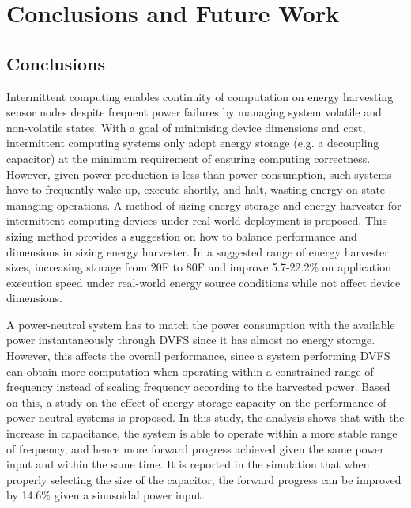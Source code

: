 \chapter{Conclusions and Future Work} \label{chapter:conclusion}

\section{Conclusions} 

Intermittent computing enables continuity of computation on energy harvesting sensor nodes despite frequent power failures by managing system volatile and non-volatile states. With a goal of minimising device dimensions and cost, intermittent computing systems only adopt energy storage (e.g. a decoupling capacitor) at the minimum requirement of ensuring computing correctness. However, given power production is less than power consumption, such systems have to frequently wake up, execute shortly, and halt, wasting energy on state managing operations. A method of sizing energy storage and energy harvester for intermittent computing devices under real-world deployment is proposed. This sizing method provides a suggestion on how to balance performance and dimensions in sizing energy harvester. In a suggested range of energy harvester sizes, increasing storage from 20\textmu F to 80\textmu F and improve 5.7-22.2\% on application execution speed under real-world energy source conditions while not affect device dimensions. 

A power-neutral system has to match the power consumption with the available power instantaneously through DVFS since it has almost no energy storage. However, this affects the overall performance, since a system performing DVFS can obtain more computation when operating within a constrained range of frequency instead of scaling frequency according to the harvested power. Based on this, a study on the effect of energy storage capacity on the performance of power-neutral systems is proposed. In this study, the analysis shows that with the increase in capacitance, the system is able to operate within a more stable range of frequency, and hence more forward progress achieved given the same power input and within the same time. It is reported in the simulation that when properly selecting the size of the capacitor, the forward progress can be improved by 14.6\% given a sinusoidal power input.



